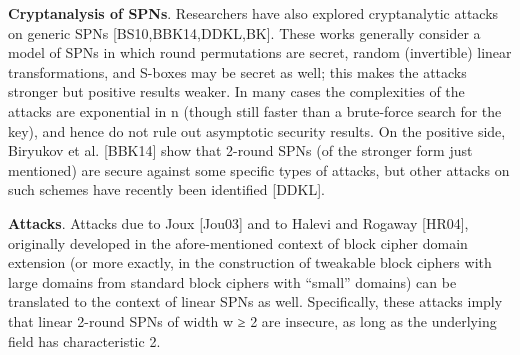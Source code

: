 {\bf Cryptanalysis of SPNs}. Researchers have also explored cryptanalytic attacks
on generic SPNs [BS10,BBK14,DDKL,BK]. These works generally consider a
model of SPNs in which round permutations are secret, random (invertible) linear
transformations, and S-boxes may be secret as well; this makes the attacks
stronger but positive results weaker. In many cases the complexities of the
attacks are exponential in n (though still faster than a brute-force search for
the key), and hence do not rule out asymptotic security results. On the positive
side, Biryukov et al. [BBK14] show that 2-round SPNs (of the stronger form just
mentioned) are secure against some specific types of attacks, but other attacks
on such schemes have recently been identified [DDKL].


{\bf Attacks}. Attacks due to Joux [Jou03] and to Halevi and Rogaway [HR04], originally
developed in the afore-mentioned context of block cipher domain extension
(or more exactly, in the construction of tweakable block ciphers with large
domains from standard block ciphers with “small” domains) can be translated
to the context of linear SPNs as well. Specifically, these attacks imply that linear
2-round SPNs of width w ≥ 2 are insecure, as long as the underlying field has
characteristic 2.




